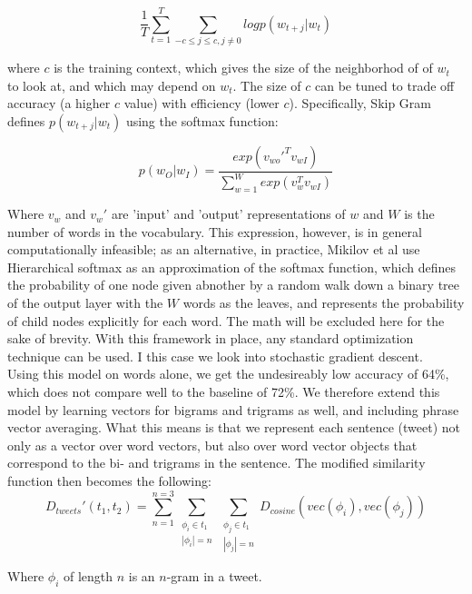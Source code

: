 \documentclass[conference]{IEEEtran}
\begin{document}
$$\frac{1}{T} \sum_{t=1}^T \sum_{-c \leq j \leq c, j \neq 0} logp(w_{t+j}|w_t)$$

where $c$ is the training context, which gives the size of the neighborhod of of $w_t$ to look at, and which may depend on $w_t$. The size of $c$ can be tuned to trade off accuracy (a higher $c$ value) with efficiency (lower $c$). Specifically, Skip Gram defines $p(w_{t+j}|w_t)$ using the softmax function:

$$p(w_O|w_I) = \frac{exp(v_{wo}'^Tv_{wI})}{\sum_{w=1}^W exp(v_w^Tv_{wI})}$$

Where $v_w$ and $v_w'$ are 'input' and 'output' representations of $w$ and $W$ is the number of words in the vocabulary.  This expression, however, is in general computationally infeasible; as an alternative, in practice, Mikilov et al use Hierarchical softmax as an approximation of the softmax function, which defines the probability of one node given abnother by a random walk down a binary tree of the output layer with the  $W$ words as the leaves, and represents the probability of child nodes explicitly for each word.  The math will be excluded here for the sake of brevity. With this framework in place, any standard optimization technique can be used. I this case we look into stochastic gradient descent.\\

Using this model on words alone, we get the undesireably low accuracy of 64\%, which does not compare well to the baseline of 72\%.  We therefore extend this model by learning vectors for bigrams and trigrams as well, and including phrase vector averaging.  What this means is that we represent each sentence (tweet) not only as a vector over word vectors, but also over word vector objects that correspond to the bi- and trigrams in the sentence.  The modified similarity function then becomes the following:\\

$$D_{tweets}'(t_1, t_2) = \sum_{n=1}^{n=3} \sum_{
\substack{\phi_i \in t_1 \\  |\phi_i| = n}} 
\sum_{\substack{\phi_j \in t_1 \\  |\phi_j| = n}} 
D_{cosine}(vec(\phi_i), vec(\phi_j))$$

Where $\phi_i$ of length $n$ is an $n$-gram in a tweet.
\end{document}
